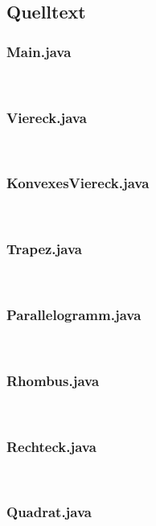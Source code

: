 \subsection{Quelltext}
\subsubsection{Main.java}\

\subsubsection{Viereck.java}\

\subsubsection{KonvexesViereck.java}\

\subsubsection{Trapez.java}\

\subsubsection{Parallelogramm.java}\

\subsubsection{Rhombus.java}\

\subsubsection{Rechteck.java}\

\subsubsection{Quadrat.java}\


